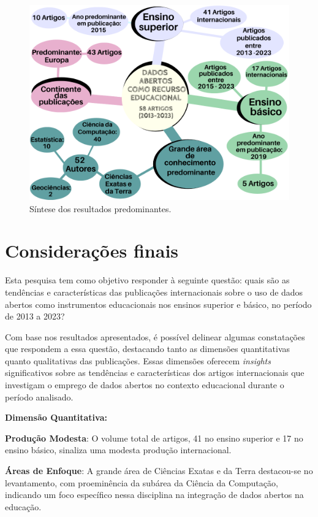 \documentclass[portuguese]{textolivre}
\begin{document}
\begin{figure}[h!]
\centering
\begin{minipage}{0.75\linewidth}
\includegraphics[width=\linewidth]{Fig7.png}
\caption{Síntese dos resultados predominantes.}
\label{fig7}
\end{minipage}
\end{figure}

\section{Considerações finais}\label{sec-autores}
Esta pesquisa tem como objetivo responder à seguinte questão: quais são as tendências e características das publicações internacionais sobre o uso de dados abertos como instrumentos educacionais nos ensinos superior e básico, no período de 2013 a 2023?

Com base nos resultados apresentados, é possível delinear algumas constatações que respondem a essa questão, destacando tanto as dimensões quantitativas quanto qualitativas das publicações. Essas dimensões oferecem \textit{insights} significativos sobre as tendências e características dos artigos internacionais que investigam o emprego de dados abertos no contexto educacional durante o período analisado.

\textbf{Dimensão Quantitativa:}

\textbf{Produção Modesta}: O volume total de artigos, 41 no ensino superior e 17 no ensino básico, sinaliza uma modesta produção internacional.

\textbf{Áreas de Enfoque}: A grande área de Ciências Exatas e da Terra destacou-se no levantamento, com proeminência da subárea da Ciência da Computação, indicando um foco específico nessa disciplina na integração de dados abertos na educação.
\end{document}
